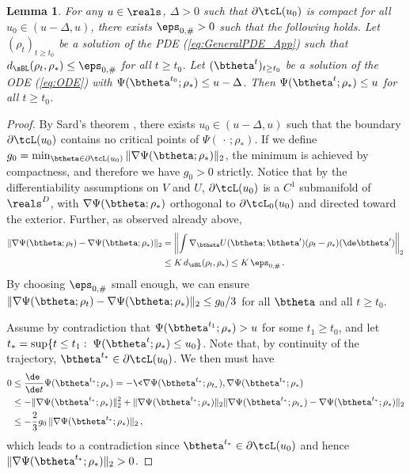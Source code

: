 \documentclass[11pt]{article}
\newtheorem{lemma}{Lemma}
\begin{document}
\begin{lemma}\label{lemma:LevelSets}
For any $u\in\reals$, $\Delta>0$ such that $\partial \tcL(u_0)$ is compact for all $u_0 \in (u - \Delta, u)$, there exists
$\eps_{0,\#}>0$ such that the following holds. Let $(\rho_t)_{t\ge t_0}$ be a solution of the PDE (\ref{eq:GeneralPDE_App}) such that $d_{\sBL}(\rho_t,\rho_*)\le \eps_{0,\#}$ for all $t\ge t_0$.
Let  $(\btheta^t)_{t\ge t_0}$ be a solution of the ODE (\ref{eq:ODE}) with $\Psi(\btheta^{t_0};\rho_*)\le u-\Delta$. Then $\Psi(\btheta^{t};\rho_*)\le u$ for all $t\ge t_0$.
\end{lemma}
%
\begin{proof}
By Sard's theorem \cite{guillemin2010differential}, there exists  $u_0\in (u-\Delta, u)$ such that the boundary $\partial \tcL(u_0)$
contains no critical points of $\Psi(\,\cdot\, ;\rho_*)$. If we define $g_0 = \min_{\btheta \in \partial \tcL(u_0)}\|\nabla\Psi(\btheta;\rho_*)\|_2$, the minimum is achieved
by compactness, and therefore we have $g_0>0$ strictly.
Notice that by the differentiability  assumptions on $V$ and $U$, $\partial \tcL(u_0)$ is a $C^1$ submanifold of $\reals^D$, with $\nabla\Psi(\btheta;\rho_*)$ 
orthogonal to $\partial \tcL_0(u_0)$ and directed toward the exterior. Further, as observed already above,
%
\begin{align}
%
\|\nabla\Psi(\btheta;\rho_t)-\nabla\Psi(\btheta;\rho_*)\|_2&= \left\|\int \nabla_{\btheta} U(\btheta;\btheta') (\rho_t-\rho_*)(\de\btheta')\right\|_2\\
&\le K\, d_{\sBL}(\rho_t,\rho_*)\le K\, \eps_{0,\#}\, .
%
\end{align}
%
By choosing $\eps_{0,\#}$ small enough, we can ensure $\|\nabla\Psi(\btheta;\rho_t)-\nabla\Psi(\btheta;\rho_*)\|_2\le g_0/3$ for all $\btheta$
and all $t\ge t_0$. 

Assume by contradiction that  $\Psi(\btheta^{t_1};\rho_*)> u$ for some $t_1\ge t_0$, 
and let $t_*=\sup\{t\le t_1:\; \Psi(\btheta^t;\rho_*)\le u_0\}$. Note that, by continuity of the trajectory,  $\btheta^{t_*}\in \partial \tcL(u_0)$.
We then must have 
%
\begin{align}
%
0 &\le \frac{\de\phantom{t}}{\de t}\Psi(\btheta^{t_*};\rho_*) = -\<\nabla\Psi(\btheta^{t_*};\rho_{t_*}),\nabla\Psi(\btheta^{t_*};\rho_*)\>\\ 
& \le  -\|\nabla\Psi(\btheta^{t_*};\rho_*)\|_2^2+\|\nabla\Psi(\btheta^{t_*};\rho_*)\|_2 \|\nabla\Psi(\btheta^{t_*};\rho_{t_*})-\nabla\Psi(\btheta^{t_*};\rho_*)\|_2\\
&\le  -\frac{2}{3} g_0 \, \|\nabla\Psi(\btheta^{t_*};\rho_*)\|_2\, ,
%
\end{align}
%
which leads to a contradiction since $\btheta^{t_*}\in \partial \tcL(u_0)$ and hence $\|\nabla\Psi(\btheta^{t_*};\rho_*)\|_2>0$.
\end{proof}
\end{document}
